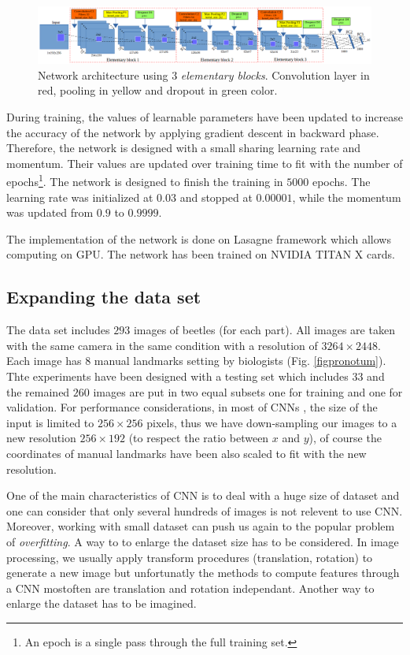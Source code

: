 \documentclass[10pt]{article}
\begin{document}
\begin{figure}[!t]
\centering
\includegraphics[scale=0.32]{images/arch_model}
\caption{{\small{Network architecture using $3$ \textit{elementary blocks}.
  Convolution
  layer in red, pooling in yellow and dropout in green color.}}} 
\label{cnnnetwork2}
\end{figure}

During training, the values of learnable parameters have been updated
to increase the accuracy of the network by applying gradient descent
in backward phase. Therefore, the network is designed with a small
sharing learning rate and momentum. Their values are updated over
training time to fit with the number of epochs\footnote{An epoch is a
  single pass through the full training set.}. The network is designed
to finish the training in $5000$ epochs. The learning rate was
initialized at $0.03$ and stopped at $0.00001$, while the momentum was
updated from $0.9$ to $0.9999$.


The implementation of the network is done
on Lasagne framework \cite{lasagne} which allows computing on GPU. The
network has been trained on NVIDIA TITAN X cards.


\subsection{Expanding the data set}
\label{sec_data}
The data set includes $293$ images of beetles (for each part). All
images are taken with the same camera in the same condition with a
resolution of $3264 \times 2448$. Each image has $8$ manual
landmarks setting by biologists (Fig. \ref{figpronotum}). Thte
experiments have been designed with a testing set which  includes $33$
and the remained $260$ images are put in two equal subsets one for
training and one for validation. For performance considerations, in most of CNNs
\cite{lecun2010convolutional, sun2013deep,  krizhevsky2012imagenet,
  cintas2016automatic}, the size of the input is limited to $256
\times 256$ pixels, thus we have down-sampling our images to a new
resolution $256 \times 192$ (to respect the ratio between $x$ and
$y$), of course the coordinates of manual landmarks have been also
scaled to fit with the new resolution.


One of the main characteristics of CNN is to deal with a huge size of
dataset and one can consider that only several hundreds of images is
not relevent to use CNN. Moreover, working with small dataset can push
us again to the popular problem of \textit{overfitting}. A way to  to
enlarge the dataset size has to be considered. In image processing, we usually apply
transform procedures (translation, rotation) to generate a new image
but unfortunatly the methods to compute features through a CNN
mostoften are translation and rotation independant. Another way to
enlarge the dataset has to be imagined.
\end{document}
